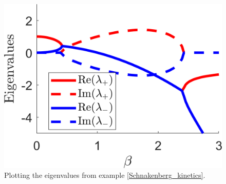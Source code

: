 \begin{figure}[!!!h!!!tb]
\centering
\includegraphics[height=\ttp]{../Pictures/Schnakenberg_stability.png}
\caption{ \label{Schnakenberg_eigenvalues}Plotting the eigenvalues from example \ref{Schnakenberg_kinetics}.}
\end{figure}


